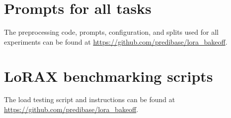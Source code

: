 \section{Prompts for all tasks}

\label{sec:appendixprompts}

The preprocessing code, prompts, configuration, and splits used for all experiments can be found at \href{https://github.com/predibase/lora_bakeoff}{https://github.com/predibase/lora\_bakeoff}. 

\section{LoRAX benchmarking scripts}

\label{sec:appendixscripts}

The load testing script and instructions can be found at \href{https://github.com/predibase/lora_bakeoff}{https://github.com/predibase/lora\_bakeoff}. 

